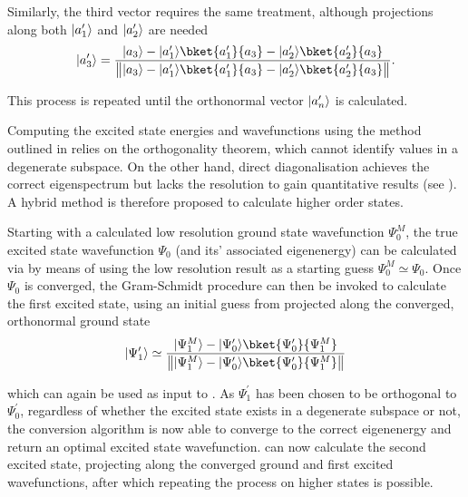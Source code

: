 Similarly, the third vector requires the same treatment, although projections along both $\lvert a^\prime_1\rangle$ and $\lvert a^\prime_2\rangle$ are needed
\begin{equation}
\ket{a^\prime_3} = \frac{\ket{a_3}-\ket{a^\prime_1}\bket{a^\prime_1}{a_3}-\ket{a^\prime_2}\bket{a^\prime_2}{a_3}}{\norm[\big]{\ket{a_3}-\ket{a^\prime_1}\bket{a^\prime_1}{a_3}-\ket{a^\prime_2}\bket{a^\prime_2}{a_3}}}.\label{eq:gs3ex}
\end{equation}

This process is repeated until the orthonormal vector $\lvert a^\prime_n\rangle$ is calculated.

Computing the excited state energies and wavefunctions using the method outlined in  relies on the orthogonality theorem, which cannot identify values in a degenerate subspace.
On the other hand, direct diagonalisation achieves the correct eigenspectrum but lacks the resolution to gain quantitative results (see ).
A hybrid method is therefore proposed to calculate higher order states.

Starting with a  calculated low resolution ground state wavefunction $\Psi_0^{M}$, the true excited state wavefunction $\Psi_0$ (and its' associated eigenenergy) can be calculated via  by means of using the low resolution result as a starting guess $\Psi_0^{M} \simeq \Psi_0$.
Once $\Psi_0$ is converged, the Gram-Schmidt procedure can then be invoked to calculate the first excited state, using an initial guess from  projected along the converged, orthonormal ground state
\begin{equation}
    \ket{\Psi^\prime_1} \simeq \frac{\ket{\Psi^M_1} - \ket{\Psi^\prime_0}\bket{\Psi^\prime_0}{\Psi^M_1}}{\norm[\big]{\ket{\Psi^M_1} - \ket{\Psi^\prime_0}\bket{\Psi^\prime_0}{\Psi^M_1}}}
\end{equation}

which can again be used as input to .
As $\Psi^\prime_1$ has been chosen to be orthogonal to $\Psi^\prime_0$, regardless of whether the excited state exists in a degenerate subspace or not, the conversion algorithm is now able to converge to the correct eigenenergy and return an optimal excited state wavefunction.
 can now calculate the second excited state, projecting along the converged ground and first excited wavefunctions, after which repeating the process  on higher states is possible.



